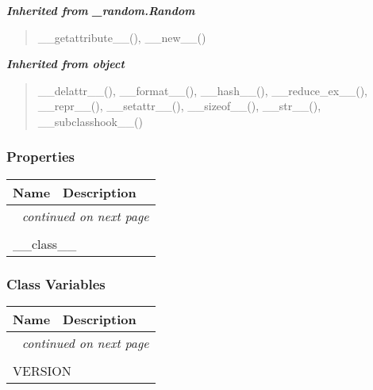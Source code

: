 \large{\textbf{\textit{Inherited from \_random.Random}}}

\begin{quote}
\_\_getattribute\_\_(), \_\_new\_\_()
\end{quote}

\large{\textbf{\textit{Inherited from object}}}

\begin{quote}
\_\_delattr\_\_(), \_\_format\_\_(), \_\_hash\_\_(), \_\_reduce\_ex\_\_(), \_\_repr\_\_(), \_\_setattr\_\_(), \_\_sizeof\_\_(), \_\_str\_\_(), \_\_subclasshook\_\_()
\end{quote}


  \subsubsection{Properties}

    \vspace{-1cm}
\hspace{\varindent}\begin{longtable}{|p{\varnamewidth}|p{\vardescrwidth}|l}
\cline{1-2}
\cline{1-2} \centering \textbf{Name} & \centering \textbf{Description}& \\
\cline{1-2}
\endhead\cline{1-2}\multicolumn{3}{r}{\small\textit{continued on next page}}\\\endfoot\cline{1-2}
\endlastfoot\multicolumn{2}{|l|}{\textit{Inherited from object}}\\
\multicolumn{2}{|p{\varwidth}|}{\raggedright \_\_class\_\_}\\
\cline{1-2}
\end{longtable}



  \subsubsection{Class Variables}

    \vspace{-1cm}
\hspace{\varindent}\begin{longtable}{|p{\varnamewidth}|p{\vardescrwidth}|l}
\cline{1-2}
\cline{1-2} \centering \textbf{Name} & \centering \textbf{Description}& \\
\cline{1-2}
\endhead\cline{1-2}\multicolumn{3}{r}{\small\textit{continued on next page}}\\\endfoot\cline{1-2}
\endlastfoot\multicolumn{2}{|l|}{\textit{Inherited from random.Random \textit{(Section \ref{random:Random})}}}\\
\multicolumn{2}{|p{\varwidth}|}{\raggedright VERSION}\\
\cline{1-2}
\end{longtable}

